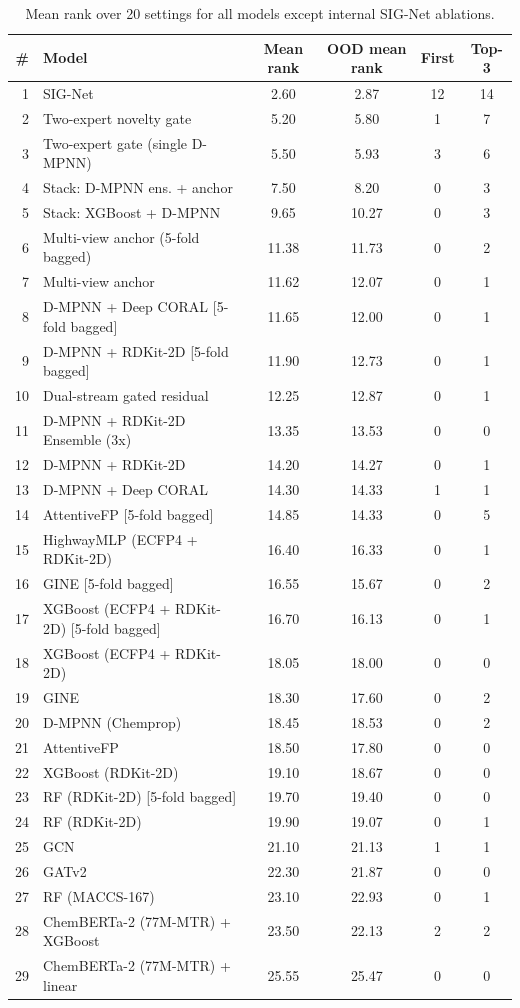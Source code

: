 \documentclass[11pt]{article}
\begin{document}
\begin{longtable}{rlcccc}
\caption{Mean rank over 20 settings for all models except internal SIG-Net ablations.}\\
\toprule
\# & Model & Mean rank & OOD mean rank & First & Top-3 \\
\midrule
1 & SIG-Net & 2.60 & 2.87 & 12 & 14 \\
2 & Two-expert novelty gate & 5.20 & 5.80 & 1 & 7 \\
3 & Two-expert gate (single D-MPNN) & 5.50 & 5.93 & 3 & 6 \\
4 & Stack: D-MPNN ens. + anchor & 7.50 & 8.20 & 0 & 3 \\
5 & Stack: XGBoost + D-MPNN & 9.65 & 10.27 & 0 & 3 \\
6 & Multi-view anchor (5-fold bagged) & 11.38 & 11.73 & 0 & 2 \\
7 & Multi-view anchor & 11.62 & 12.07 & 0 & 1 \\
8 & D-MPNN + Deep CORAL [5-fold bagged] & 11.65 & 12.00 & 0 & 1 \\
9 & D-MPNN + RDKit-2D [5-fold bagged] & 11.90 & 12.73 & 0 & 1 \\
10 & Dual-stream gated residual & 12.25 & 12.87 & 0 & 1 \\
11 & D-MPNN + RDKit-2D Ensemble (3x) & 13.35 & 13.53 & 0 & 0 \\
12 & D-MPNN + RDKit-2D & 14.20 & 14.27 & 0 & 1 \\
13 & D-MPNN + Deep CORAL & 14.30 & 14.33 & 1 & 1 \\
14 & AttentiveFP [5-fold bagged] & 14.85 & 14.33 & 0 & 5 \\
15 & HighwayMLP (ECFP4 + RDKit-2D) & 16.40 & 16.33 & 0 & 1 \\
16 & GINE [5-fold bagged] & 16.55 & 15.67 & 0 & 2 \\
17 & XGBoost (ECFP4 + RDKit-2D) [5-fold bagged] & 16.70 & 16.13 & 0 & 1 \\
18 & XGBoost (ECFP4 + RDKit-2D) & 18.05 & 18.00 & 0 & 0 \\
19 & GINE & 18.30 & 17.60 & 0 & 2 \\
20 & D-MPNN (Chemprop) & 18.45 & 18.53 & 0 & 2 \\
21 & AttentiveFP & 18.50 & 17.80 & 0 & 0 \\
22 & XGBoost (RDKit-2D) & 19.10 & 18.67 & 0 & 0 \\
23 & RF (RDKit-2D) [5-fold bagged] & 19.70 & 19.40 & 0 & 0 \\
24 & RF (RDKit-2D) & 19.90 & 19.07 & 0 & 1 \\
25 & GCN & 21.10 & 21.13 & 1 & 1 \\
26 & GATv2 & 22.30 & 21.87 & 0 & 0 \\
27 & RF (MACCS-167) & 23.10 & 22.93 & 0 & 1 \\
28 & ChemBERTa-2 (77M-MTR) + XGBoost & 23.50 & 22.13 & 2 & 2 \\
29 & ChemBERTa-2 (77M-MTR) + linear & 25.55 & 25.47 & 0 & 0 \\
\bottomrule
\end{longtable}
\end{document}
